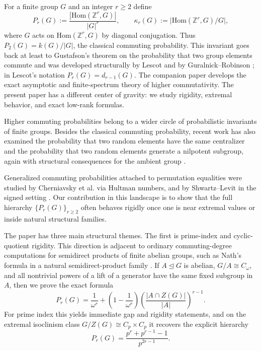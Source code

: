 \documentclass[11pt]{article}
\theoremstyle{definition}
\theoremstyle{remark}
\theoremstyle{definition}
\theoremstyle{plain}
\newcommand{\Hom}{\mathrm{Hom}}
\begin{document}
For a finite group $G$ and an integer $r\ge 2$ define
\[
P_r(G):=\frac{|\Hom(\mathbb Z^r,G)|}{|G|^r},
\qquad
\kappa_r(G):=\big|\Hom(\mathbb Z^r,G)/G\big|,
\]
where $G$ acts on $\Hom(\mathbb Z^r,G)$ by diagonal conjugation. Thus $P_2(G)=k(G)/|G|$, the classical commuting probability. This invariant goes back at least to Gustafson's theorem on the probability that two group elements commute and was developed structurally by Lescot and by Guralnick--Robinson \cite{Gustafson1973,Lescot1995,GuralnickRobinson2006}; in Lescot's notation $P_r(G)=d_{r-1}(G)$. The companion paper \cite{LevitShwartzPartI} develops the exact asymptotic and finite-spectrum theory of higher commutativity. The present paper has a different center of gravity: we study rigidity, extremal behavior, and exact low-rank formulas.

Higher commuting probabilities belong to a wider circle of probabilistic invariants of finite groups. Besides the classical commuting probability, recent work has also examined the probability that two random elements have the same centralizer and the probability that two random elements generate a nilpotent subgroup, again with structural consequences for the ambient group \cite{RahimiradZarrin2025,Lucchini2026}.

Generalized commuting probabilities attached to permutation equalities were studied by Cherniavsky et al. via Hultman numbers, and by Shwartz--Levit in the signed setting \cite{CherniavskyGoldsteinLevitShwartz2017,ShwartzLevit2022}. Our contribution in this landscape is to show that the full hierarchy $\{P_r(G)\}_{r\ge2}$ often behaves rigidly once one is near extremal values or inside natural structural families.

The paper has three main structural themes. The first is prime-index and cyclic-quotient rigidity. This direction is adjacent to ordinary commuting-degree computations for semidirect products of finite abelian groups, such as Nath's formula in a natural semidirect-product family \cite{Nath2013}. If $A\trianglelefteq G$ is abelian, $G/A\cong C_{\omega}$, and all nontrivial powers of a lift of a generator have the same fixed subgroup in $A$, then we prove the exact formula
\[
P_r(G)=\frac{1}{\omega^r}+\left(1-\frac{1}{\omega^r}\right)\left(\frac{|A\cap Z(G)|}{|A|}\right)^{r-1}.
\]
For prime index this yields immediate gap and rigidity statements, and on the extremal isoclinism class $G/Z(G)\cong C_p\times C_p$ it recovers the explicit hierarchy
\[
P_r(G)=\frac{p^r+p^{r-1}-1}{p^{2r-1}}.
\]
\end{document}
